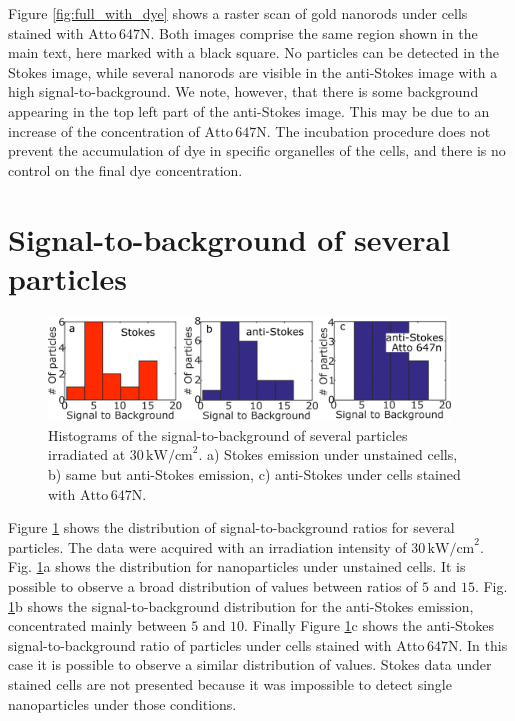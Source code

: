 \documentclass[journal=nalefd,manuscript=letter]{achemso}
\newcommand{\pwr}{\ensuremath{\,\textrm{kW/cm}^2}}
\newcommand{\atto}{\ensuremath{\textrm{Atto}\,647\textrm{N}}}
\begin{document}
Figure \ref{fig:full_with_dye} shows a raster scan of gold nanorods under cells
stained with $\atto$. Both images comprise the same region shown in the main
text, here marked with a black square. No particles can be detected in the
Stokes image, while several nanorods are visible in the anti-Stokes image with a
high signal-to-background. We note, however, that there is some
background appearing in the top left part of the anti-Stokes image. This may be
due to an increase of the concentration of $\atto$. The incubation procedure does
not prevent the accumulation of dye in specific organelles of the cells, and
there is no control on the final dye concentration. 

\section{Signal-to-background of several particles}
\begin{figure}[htp] \centering
\includegraphics[width=0.95\textwidth]{Figures/Supplementary/08_Histograms_SN/08_histograms.png}
\caption{Histograms of the signal-to-background of several particles irradiated
at $30\pwr$. a) Stokes emission under unstained cells, b) same but anti-Stokes
emission, c) anti-Stokes under cells stained with \atto.}
	\label{fig:histograms_SB}
\end{figure}

Figure \ref{fig:histograms_SB} shows the distribution of signal-to-background
ratios for several particles. The data were acquired with an irradiation
intensity of $30\pwr$. Fig. \ref{fig:histograms_SB}a shows the distribution for
nanoparticles under unstained cells. It is possible to observe a broad
distribution of values between ratios of $5$ and $15$. Fig.
\ref{fig:histograms_SB}b shows the signal-to-background distribution for the
anti-Stokes emission, concentrated mainly between $5$ and $10$. Finally Figure
\ref{fig:histograms_SB}c shows the anti-Stokes signal-to-background ratio of
particles under cells stained with \atto. In this case it is possible to observe
a similar distribution of values. Stokes data under stained cells are not
presented because it was impossible to detect single nanoparticles under those
conditions. 
\end{document}
